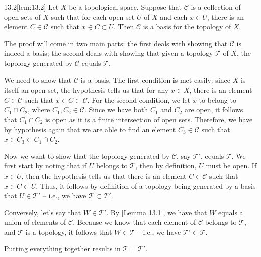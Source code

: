 \begin{thmBox}[Lemma]{13.2}[lem:13.2]
    Let \( X \) be a topological space. Suppose that \( \mathcal{C} \) is a 
    collection of open sets of \( X \) such that for each open set \( U \) of 
    \( X \) and each \( x \in U \), there is an element \( C \in \mathcal{C} \)
    such that \( x \in C \subset U \). Then \( \mathcal{C} \) is a basis for
    the topology of \( X \). 

    \baseRule

    \begin{proofBox}
        The proof will come in two main parts: the first deals with showing 
        that \( \mathcal{C} \) is indeed a basis; the second deals with 
        showing that given a topology \( \mathcal{T} \) of \( X \), the 
        topology generated by \( \mathcal{C} \) equals \( \mathcal{T} \).

        \baseSkip 

        We need to show that \( \mathcal{C} \) is a basis. 
        The first condition is met easily: since \( X \) is itself an open set,
        the hypothesis tells us that for any \( x \in X \), there is an element 
        \( C \in \mathcal{C} \) such that \( x \in C \subset \mathcal{C} \).
        For the second condition, we let \( x \) to belong to 
        \( C_{ 1 } \cap C_{ 2 } \), where 
        \( C_{ 1 }, C_{ 2 } \in \mathcal{C} \).
        Since we have both \( C_{ 1 } \) and \( C_{ 2 } \) are open, it follows 
        that \( C_{ 1 } \cap C_{ 2 } \) is open as it is a finite intersection
        of open sets. 
        Therefore, we have by hypothesis again that we are able to find an 
        element \( C_{ 3 } \in \mathcal{C} \) such that 
        \( x \in C_{ 3 } \subset C_{ 1 } \cap C_{ 2 } \).
        
        \baseSkip

        Now we want to show that the topology generated by \( \mathcal{C} \), 
        say \( \mathcal{T}' \), equals \( \mathcal{T} \). 
        We first start by noting that if \( U \) belongs to \( \mathcal{T} \),
        then by definition, \( U \) must be open.
        If \( x \in U \), then the hypothesis tells us that there is an 
        element \( C \in \mathcal{C} \) such that \( x \in C \subset U \).
        Thus, it follows by definition of a topology being generated by a basis
        that \( U \in \mathcal{T}' \) -- i.e., we have 
        \( \mathcal{T} \subset \mathcal{T}' \).

        \baseSkip

        Conversely, let's say that \( W \in \mathcal{T}' \). By 
        [\hyperlink{lem:13.1}{Lemma 13.1}], we have that \( W \) equals a union
        of elements of \( \mathcal{C} \). Because we know that each element of
        \( \mathcal{C} \) belongs to \( \mathcal{T} \), and \( \mathcal{T} \) 
        is a topology, it follows that \( W \in \mathcal{T} \) -- 
        i.e., we have \( \mathcal{T'} \subset \mathcal{T} \).

        \baseSkip

        Putting everything together results in \( \mathcal{T} = \mathcal{T}' \).
    \end{proofBox}
\end{thmBox}

